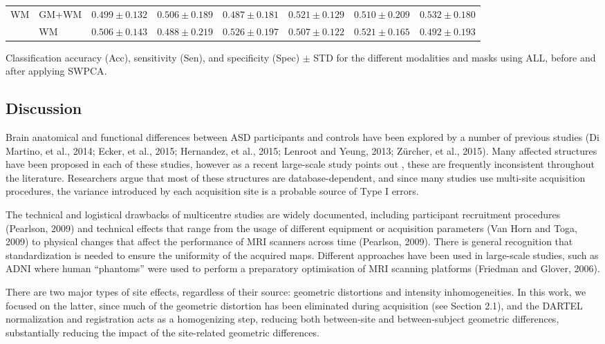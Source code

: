 \begin{bigtable}
\begin{tabularx}{\linewidth}{ll|XXX|XXX}
		\midrule
		\multirow{2}{*}{\ac{WM}} &GM+WM &
		$ 0.499 \pm 0.132 $ & $ 0.506 \pm 0.189 $ & $ 0.487 \pm 0.181 $ & $ 0.521 \pm 0.129 $ & $ 0.510 \pm 0.209 $ &  $ 0.532 \pm 0.180 $ \\
		&
		WM &
		$ 0.506 \pm 0.143 $ & $ 0.488 \pm 0.219 $ & $ 0.526 \pm 0.197 $ & $ 0.507 \pm 0.122 $ & $ 0.521 \pm 0.165 $ &   $ 0.492 \pm 0.193 $ \\
		\bottomrule
	\end{tabularx}
	\caption[Classification accuracy (Acc), sensitivity (Sen), and specificity (Spec) $\pm$ STD for the different modalities and masks using ALL, before and after applying \acs{SWPCA}.]{Classification accuracy (Acc), sensitivity (Sen), and specificity (Spec) $\pm$ STD for the different modalities and masks using ALL, before and after applying \ac{SWPCA}.}
	\label{tab:swpcaALL}
\end{bigtable}

\subsection{Discussion}
Brain anatomical and functional differences between \ac{ASD} participants and
controls have been explored by a number of previous studies (Di
Martino, et al., 2014; Ecker, et al., 2015; Hernandez, et al., 2015;
Lenroot and Yeung, 2013; Zürcher, et al., 2015). Many affected
structures have been proposed in each of these studies, however as a
recent large-scale study points out \cite{haar2014anatomical}, these are
frequently inconsistent throughout the literature. Researchers argue
that most of these structures are database-dependent, and since many
studies use multi-site acquisition procedures, the variance introduced
by each acquisition site is a probable source of Type I errors. 


The technical and logistical drawbacks of multicentre studies are widely
documented, including participant recruitment procedures (Pearlson,
2009) and technical effects that range from the usage of different
equipment or acquisition parameters (Van Horn and Toga, 2009) to
physical changes that affect the performance of \ac{MRI} scanners across
time (Pearlson, 2009). There is general recognition that
standardization is needed to ensure the uniformity of the acquired
maps. Different approaches have been used in large-scale studies, such
as \ac{ADNI} where human
“phantoms” were used to perform a preparatory optimisation of \ac{MRI}
scanning platforms (Friedman and Glover, 2006). 


There are two major types of site effects, regardless of their source:
geometric distortions and intensity inhomogeneities. In this work, we
focused on the latter, since much of the geometric distortion has been
eliminated during acquisition (see Section 2.1), and the DARTEL
normalization and registration acts as a homogenizing step, reducing
both between-site and between-subject geometric differences,
substantially reducing the impact of the site-related geometric
differences. 


